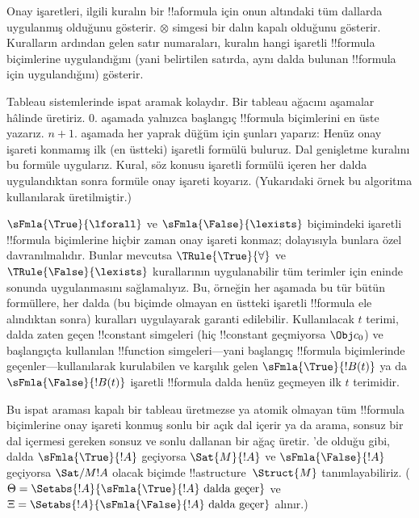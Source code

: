 Onay işaretleri, ilgili kuralın bir !!a{formula} için onun altındaki
tüm dallarda uygulanmış olduğunu gösterir. $\otimes$ simgesi bir dalın
kapalı olduğunu gösterir. Kuralların ardından gelen satır numaraları,
kuralın hangi işaretli !!{formula} biçimlerine uygulandığını (yani belirtilen
satırda, aynı dalda bulunan !!{formula} için uygulandığını) gösterir.

Tableau sistemlerinde ispat aramak kolaydır. Bir tableau ağacını aşamalar hâlinde
üretiriz. $0$. aşamada yalnızca başlangıç !!{formula} biçimlerini en üste
yazarız. $n+1$. aşamada her yaprak düğüm için şunları yaparız: Henüz
onay işareti konmamış ilk (en üstteki) işaretli formülü buluruz. Dal
genişletme kuralını bu formüle uygularız. Kural, söz konusu işaretli
formülü içeren her dalda uygulandıktan sonra formüle onay işareti
koyarız. (Yukarıdaki örnek bu algoritma kullanılarak üretilmiştir.)

$\sFmla{\True}{\lforall}$ ve $\sFmla{\False}{\lexists}$ biçimindeki
işaretli !!{formula} biçimlerine hiçbir zaman onay işareti konmaz; dolayısıyla
bunlara özel davranılmalıdır. Bunlar mevcutsa $\TRule{\True}{\forall}$
ve $\TRule{\False}{\lexists}$ kurallarının uygulanabilir tüm terimler
için eninde sonunda uygulanmasını sağlamalıyız. Bu, örneğin her aşamada
bu tür bütün formüllere, her dalda (bu biçimde olmayan en üstteki
işaretli !!{formula} ele alındıktan sonra) kuralları uygulayarak garanti
edilebilir. Kullanılacak $t$ terimi, dalda zaten geçen !!{constant} simgeleri
(hiç !!{constant} geçmiyorsa $\Obj c_0$) ve başlangıçta kullanılan
!!{function} simgeleri---yani başlangıç !!{formula} biçimlerinde
geçenler---kullanılarak kurulabilen ve
karşılık gelen $\sFmla{\True}{!B(t)}$ ya da
$\sFmla{\False}{!B(t)}$ işaretli !!{formula} dalda henüz geçmeyen ilk
$t$ terimidir.

Bu ispat araması kapalı bir tableau üretmezse ya atomik olmayan tüm
!!{formula} biçimlerine onay işareti konmuş sonlu bir açık dal içerir ya da
arama, sonsuz bir dal içermesi gereken sonsuz ve sonlu dallanan bir
ağaç üretir. 'de olduğu gibi, dalda
$\sFmla{\True}{!A}$ geçiyorsa $\Sat{M}{!A}$ ve
$\sFmla{\False}{!A}$ geçiyorsa $\Sat/{M}{!A}$ olacak biçimde
!!a{structure}~$\Struct{M}$ tanımlayabiliriz. ($\Theta =
\Setabs{!A}{\sFmla{\True}{!A} \text{ dalda geçer}}$ ve $\Xi =
\Setabs{!A}{\sFmla{\False}{!A} \text{ dalda geçer}}$ alınır.)

